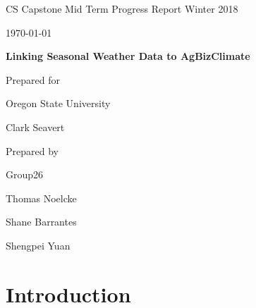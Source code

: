 \documentclass[onecolumn, draftclsnofoot,10pt, compsoc]{article}
\def \CapstoneTeamName{AgBizClimate}
\def \CapstoneTeamNumber{26}
\def \GroupMemberOne{	Thomas Noelcke}
\def \GroupMemberTwo{	Shane Barrantes}
\def \GroupMemberThree{	Shengpei Yuan}
\def \CapstoneProjectName{ Linking Seasonal Weather Data to AgBizClimate\texttrademark}
\def \CapstoneSponsorCompany{ Oregon State University}
\def \CapstoneSponsorPerson{ Clark Seavert}
\def \DocType{		%
				Mid Term Progress Report Winter 2018 
				}
\newcommand{\NameSigPair}[1]{\par
\makebox[2.75in][r]{#1} \hfil 	\makebox[3.25in]{\makebox[2.25in]{\hrulefill} \hfill		\makebox[.75in]{\hrulefill}}
\par\vspace{-12pt} \textit{\tiny\noindent
\makebox[2.75in]{} \hfil		\makebox[3.25in]{\makebox[2.25in][r]{Signature} \hfill	\makebox[.75in][r]{Date}}}}
\renewcommand{\NameSigPair}[1]{#1}
\begin{document}
\begin{titlepage}
    \begin{singlespace}
        \hfill
        \par\vspace{.2in}
        \centering
        \scshape{
            \huge CS Capstone \DocType \par
            {\large\today}\par
            \vspace{.5in}
            \textbf{\Huge\CapstoneProjectName}\par
            \vfill
            {\large Prepared for}\par
            \Huge \CapstoneSponsorCompany\par
            \vspace{5pt}
            {\Large\NameSigPair{\CapstoneSponsorPerson}\par}
            {\large Prepared by }\par
            Group\CapstoneTeamNumber\par
            \vspace{5pt}
            {\Large
                \NameSigPair{\GroupMemberOne}\par
                \NameSigPair{\GroupMemberTwo}\par
                \NameSigPair{\GroupMemberThree}\par
            }
            \vspace{20pt}
        }
        \begin{abstract}
						
        \end{abstract}
    \end{singlespace}
\end{titlepage}
\newpage
{}
\tableofcontents
\listoffigures 
\newpage
\clearpage

\section{Introduction}
\end{document}
